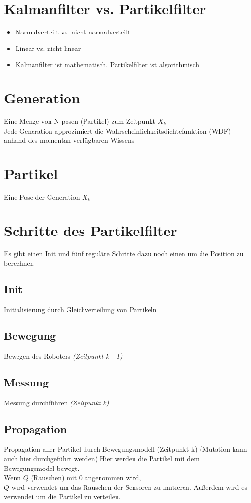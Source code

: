 		
	
	\section{Kalmanfilter vs. Partikelfilter}	
		\begin{itemize}
		\item Normalverteilt vs. nicht normalverteilt
		\item Linear vs. nicht linear
		\item Kalmanfilter ist mathematisch, Partikelfilter ist algorithmisch
	\end{itemize}

	\section{Generation}
		Eine Menge von N posen (Partikel) zum Zeitpunkt $X_k$ \\
		Jede Generation approzimiert die Wahrscheinlichkeitsdichtefunktion (WDF) anhand des momentan verfügbaren Wissens

	\section{Partikel}
		Eine Pose der Generation $X_k$
		
	\section{Schritte des Partikelfilter}

		Es gibt einen Init und fünf reguläre Schritte dazu noch einen um die Position zu berechnen
		
		\subsection{Init}
		Initialisierung durch Gleichverteilung von Partikeln
		
		\subsection{Bewegung}
		Bewegen des Roboters \textit{(Zeitpunkt k - 1)}
		
		\subsection{Messung}
		Messung durchführen \textit{(Zeitpunkt k)}
		
		\subsection{Propagation}
		Propagation aller Partikel durch Bewegungsmodell (Zeitpunkt k) (Mutation kann auch hier durchgeführt werden)
		Hier werden die Partikel mit dem Bewegungsmodel bewegt. \\
		Wenn $Q$ (Rauschen) mit 0 angenommen wird, \\
		$Q$ wird verwendet um das Rauschen der Sensoren zu imitieren. Außerdem wird es verwendet um die Partikel zu verteilen.
		
